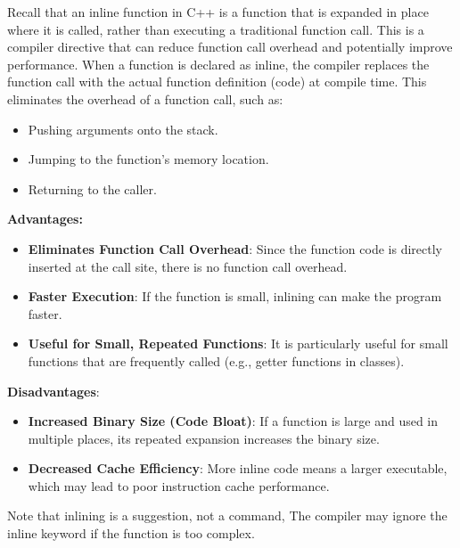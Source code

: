 \documentclass{report}
\begin{document}
    \pagebreak 
    \bigbreak \noindent 
    Recall that an inline function in C++ is a function that is expanded in place where it is called, rather than executing a traditional function call. This is a compiler directive that can reduce function call overhead and potentially improve performance.
    \bigbreak \noindent 
    When a function is declared as inline, the compiler replaces the function call with the actual function definition (code) at compile time. This eliminates the overhead of a function call, such as:
    \begin{itemize}
        \item Pushing arguments onto the stack.
        \item Jumping to the function's memory location.
        \item Returning to the caller.
    \end{itemize}
    \bigbreak \noindent 
    \textbf{Advantages:}
    \begin{itemize}
        \item \textbf{Eliminates Function Call Overhead}: Since the function code is directly inserted at the call site, there is no function call overhead.
        \item \textbf{Faster Execution}: If the function is small, inlining can make the program faster.
        \item \textbf{Useful for Small, Repeated Functions}: It is particularly useful for small functions that are frequently called (e.g., getter functions in classes).
    \end{itemize}
    \bigbreak \noindent 
    \textbf{Disadvantages}:
    \begin{itemize}
        \item \textbf{Increased Binary Size (Code Bloat)}: If a function is large and used in multiple places, its repeated expansion increases the binary size.
        \item \textbf{Decreased Cache Efficiency}: More inline code means a larger executable, which may lead to poor instruction cache performance.
    \end{itemize}
    \bigbreak \noindent 
    Note that inlining is a suggestion, not a command, The compiler may ignore the inline keyword if the function is too complex.

    \bigbreak \noindent 
\end{document}

